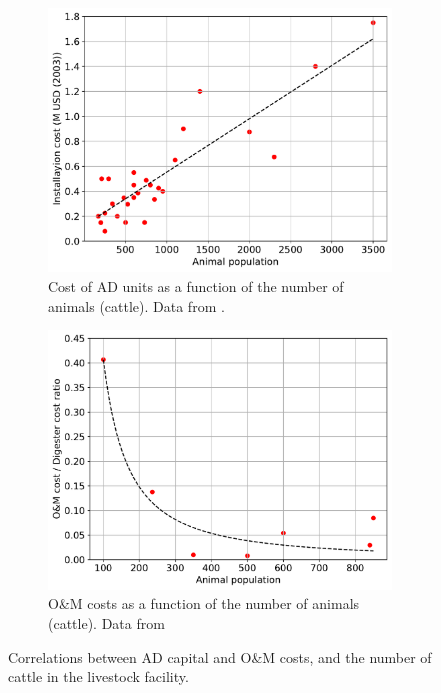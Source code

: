 \documentclass[10pt,a4paper]{article}
\begin{document}
\begin{figure}[H]
	\centering
	\begin{subfigure}[t]{0.49\textwidth}
		\includegraphics[width=\textwidth, trim={0cm 0cm 0cm 0cm},clip]{AD_size_cost}
		\caption{Cost of AD units as a function of the number of animals (cattle). Data from .}
		\label{fig:AD_size_cost}
	\end{subfigure}
	\quad
	\begin{subfigure}[t]{0.46\textwidth}
		\includegraphics[width=\textwidth]{AD_size_OM_Unit_cost} 
		\caption{O\&M costs as a function of the number of animals (cattle). Data from }
		\label{fig:AD_size_OM_Unit_cost}
	\end{subfigure}
	
	\caption{Correlations between AD capital and O\&M costs, and the number of cattle in the livestock facility.}
	\label{fig:AD_size_2cost}
\end{figure}
\end{document}
